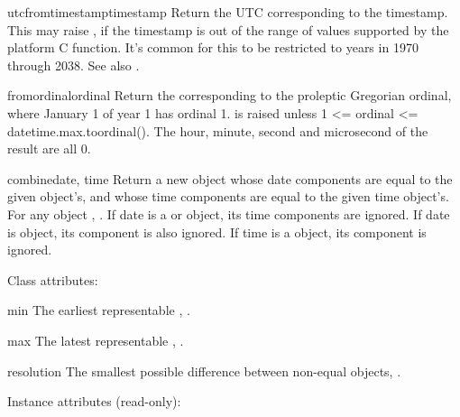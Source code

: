 \begin{methoddesc}{utcfromtimestamp}{timestamp}
  Return the UTC  corresponding to the \POSIX{}
  timestamp.  This may raise , if the
  timestamp is out of the range of values supported by the platform
  C  function.  It's common for this to be
  restricted to years in 1970 through 2038.
  See also .
\end{methoddesc}

\begin{methoddesc}{fromordinal}{ordinal}
  Return the  corresponding to the proleptic
  Gregorian ordinal, where January 1 of year 1 has ordinal 1.
   is raised unless 1 <= ordinal <=
  datetime.max.toordinal().  The hour, minute, second and
  microsecond of the result are all 0.
\end{methoddesc}

\begin{methoddesc}{combine}{date, time}
  Return a new  object whose date components are
  equal to the given  object's, and whose time
  components are equal to the given time object's.  For any
   object , .  If date is a
   or  object, its time components
  are ignored.  If date is  object, its
   component is also ignored.  If time is a
   object, its  component is ignored.
\end{methoddesc}

Class attributes:

\begin{memberdesc}{min}
  The earliest representable ,
  .
\end{memberdesc}

\begin{memberdesc}{max}
  The latest representable ,
  .
\end{memberdesc}

\begin{memberdesc}{resolution}
  The smallest possible difference between non-equal 
  objects, .
\end{memberdesc}

Instance attributes (read-only):

